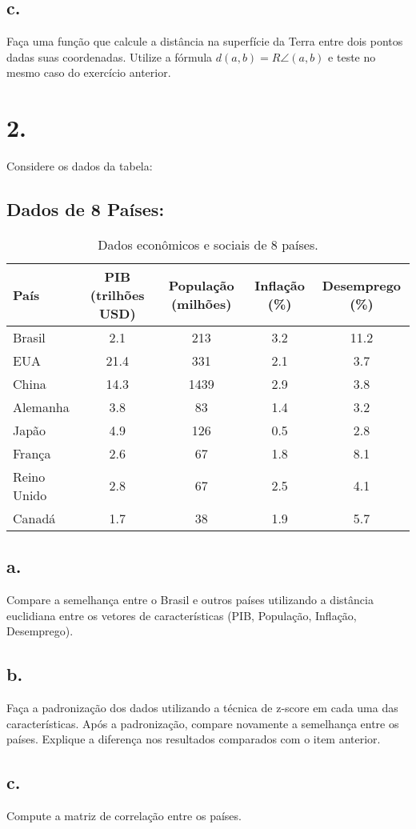 \documentclass[a4paper,12pt]{article}
\begin{document}
\subsection*{c.}
Faça uma função que calcule a distância na superfície da Terra entre dois pontos dadas suas coordenadas. Utilize a fórmula $d(a,b) = R \angle(a,b)$ e teste no mesmo caso do exercício anterior.

\section*{2.}

Considere os dados da tabela:

\subsection*{Dados de 8 Países:}

\begin{table}[h!]
    \centering
    \begin{tabular}{|l|c|c|c|c|}
        \hline
        \textbf{País} & \textbf{PIB (trilhões USD)} & \textbf{População (milhões)} & \textbf{Inflação (\%)} & \textbf{Desemprego (\%)} \\
        \hline
        Brasil & 2.1 & 213 & 3.2 & 11.2 \\
        EUA & 21.4 & 331 & 2.1 & 3.7 \\
        China & 14.3 & 1439 & 2.9 & 3.8 \\
        Alemanha & 3.8 & 83 & 1.4 & 3.2 \\
        Japão & 4.9 & 126 & 0.5 & 2.8 \\
        França & 2.6 & 67 & 1.8 & 8.1 \\
        Reino Unido & 2.8 & 67 & 2.5 & 4.1 \\
        Canadá & 1.7 & 38 & 1.9 & 5.7 \\
        \hline
    \end{tabular}
    \caption{Dados econômicos e sociais de 8 países.}
\end{table}

\subsection*{a.}
Compare a semelhança entre o Brasil e outros países utilizando a distância euclidiana entre os vetores de características (PIB, População, Inflação, Desemprego).

\subsection*{b.}
Faça a padronização dos dados utilizando a técnica de z-score em cada uma das características. Após a padronização, compare novamente a semelhança entre os países. Explique a diferença nos resultados comparados com o item anterior.

\subsection*{c.}
Compute a matriz de correlação entre os países.
\end{document}
